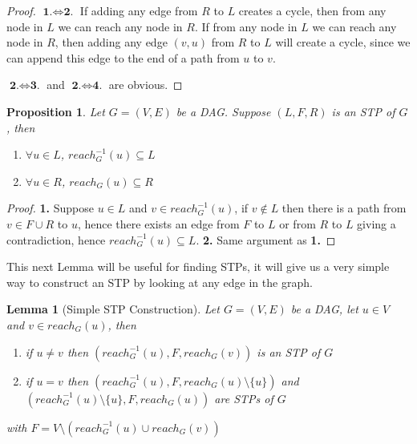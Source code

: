 \documentclass{report}
\newtheorem{lemma}[theorem]{Lemma}
\newtheorem{proposition}[theorem]{Proposition}
\begin{document}
\begin{proof}
$\textbf{1.} \Leftrightarrow \textbf{2.}$ If adding any edge from $R$ to $L$ creates a cycle, then from any node in $L$ we can reach any node in $R$. If from any node in $L$ we can reach any node in $R$, then adding any edge $(v,u)$ from $R$ to $L$ will create a cycle, since we can append this edge to the end of a path from $u$ to $v$.

$\textbf{2.} \Leftrightarrow \textbf{3.}$ and $\textbf{2.} \Leftrightarrow \textbf{4.}$ are obvious.
\end{proof}

\begin{proposition}
Let $G=(V,E)$ be a DAG. Suppose $(L,F,R)$ is an STP of $G$, then
\begin{enumerate}
\item $\forall u \in L$, $reach_{G}^{-1}(u) \subseteq L$
\item $\forall u \in R$, $reach_{G}(u) \subseteq R$
\end{enumerate}
\end{proposition}

\begin{proof}
\textbf{1.} Suppose $u \in L$ and $v \in reach_{G}^{-1}(u)$, if $v \notin L$ then there is a path from $v \in F \cup R$ to $u$, hence there exists an edge from $F$ to $L$ or from $R$ to $L$ giving a contradiction, hence $reach_{G}^{-1}(u) \subseteq L$. \textbf{2.} Same argument as \textbf{1.}
\end{proof}

This next Lemma will be useful for finding STPs, it will give us a very simple way to construct an STP by looking at any edge in the graph.

\begin{lemma}[Simple STP Construction]
Let $G=(V,E)$ be a DAG, let $u \in V$ and $v \in reach_{G}(u)$, then
\begin{enumerate}
\item if $u \neq v$ then $(reach_{G}^{-1}(u),F,reach_{G}(v))$ is an STP of $G$
\item if $u = v$ then $(reach_{G}^{-1}(u),F,reach_{G}(u) \setminus{\{u\}})$ and $(reach_{G}^{-1}(u) \setminus{\{u\}},F,reach_{G}(u))$ are STPs of $G$
\end{enumerate}
with $F=V \setminus (reach_{G}^{-1}(u) \cup reach_{G}(v))$
\end{lemma}
\end{document}
